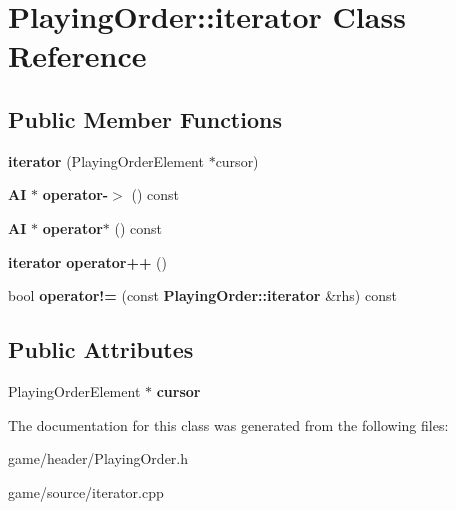 \section{Playing\-Order\-:\-:iterator Class Reference}
\label{class_playing_order_1_1iterator}
\subsection*{Public Member Functions}
\begin{DoxyCompactItemize}
\item 
{\bfseries iterator} (Playing\-Order\-Element $\ast$cursor)\label{class_playing_order_1_1iterator_aa1acaaf5aa4cb04b45d688bdb2585cb7}

\item 
{\bf A\-I} $\ast$ {\bfseries operator-\/$>$} () const \label{class_playing_order_1_1iterator_ae273376a2c7a09cbad0ddc17a9120a57}

\item 
{\bf A\-I} $\ast$ {\bfseries operator$\ast$} () const \label{class_playing_order_1_1iterator_a766bf56248a6beb3a7515de7fe6e85f0}

\item 
{\bf iterator} {\bfseries operator++} ()\label{class_playing_order_1_1iterator_a53d94a59d257d705067a6631c11b31cc}

\item 
bool {\bfseries operator!=} (const {\bf Playing\-Order\-::iterator} \&rhs) const \label{class_playing_order_1_1iterator_aff6e658fd7eb13f7538bcd88efd66ad2}

\end{DoxyCompactItemize}
\subsection*{Public Attributes}
\begin{DoxyCompactItemize}
\item 
Playing\-Order\-Element $\ast$ {\bfseries cursor}\label{class_playing_order_1_1iterator_a8685cc1ee395f5b45ea6ec85c2110ebd}

\end{DoxyCompactItemize}


The documentation for this class was generated from the following files\-:\begin{DoxyCompactItemize}
\item 
game/header/Playing\-Order.\-h\item 
game/source/iterator.\-cpp\end{DoxyCompactItemize}
